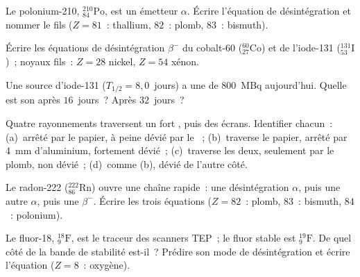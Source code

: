 \begin{exercise}[$\star$]\label{exo:g11:nucleus-radioactivity:3}
Le polonium-210, ${}^{210}_{84}\mathrm{Po}$, est un émetteur $\alpha$.
Écrire l'équation de désintégration et nommer le  fils ($Z = 81$~:
thallium, $82$~: plomb, $83$~: bismuth).
\end{exercise}

\begin{exercise}[$\star$]\label{exo:g11:nucleus-radioactivity:4}
Écrire les équations de désintégration $\beta^-$ du cobalt-60
(${}^{60}_{27}\mathrm{Co}$) et de l'iode-131
(${}^{131}_{53}\mathrm{I}$)~; noyaux fils~: $Z = 28$ nickel, $Z = 54$
xénon.
\end{exercise}

\begin{exercise}[$\star$]\label{exo:g11:nucleus-radioactivity:5}
Une source d'iode-131 ($T_{1/2} = 8{,}0$~jours) a une
 de \qty{800}{MBq}
aujourd'hui. Quelle est son
 après $16$~jours~? Après
$32$~jours~?
\end{exercise}

\begin{exercise}[$\star\star$]\label{exo:g11:nucleus-radioactivity:6}
Quatre rayonnements traversent un fort
, puis des écrans.
Identifier chacun~: (a)~arrêté par le papier, à peine dévié par le
~; (b)~traverse le papier,
arrêté par \qty{4}{mm} d'aluminium, fortement dévié~; (c)~traverse les
deux, seulement  par le plomb,
non dévié~; (d)~comme (b), dévié de l'autre côté.
\end{exercise}

\begin{exercise}[$\star\star$]\label{exo:g11:nucleus-radioactivity:7}
Le radon-222 (${}^{222}_{86}\mathrm{Rn}$) ouvre une chaîne rapide~: une
désintégration $\alpha$, puis une autre $\alpha$, puis une $\beta^-$.
Écrire les trois équations ($Z = 82$~: plomb, $83$~: bismuth, $84$~:
polonium).
\end{exercise}

\begin{exercise}[$\star\star$]\label{exo:g11:nucleus-radioactivity:8}
Le fluor-18, ${}^{18}_{9}\mathrm{F}$, est le traceur des scanners TEP~;
le fluor stable est ${}^{19}_{9}\mathrm{F}$. De quel côté de la bande
de stabilité est-il~? Prédire son mode de désintégration et écrire
l'équation ($Z = 8$~: oxygène).
\end{exercise}

